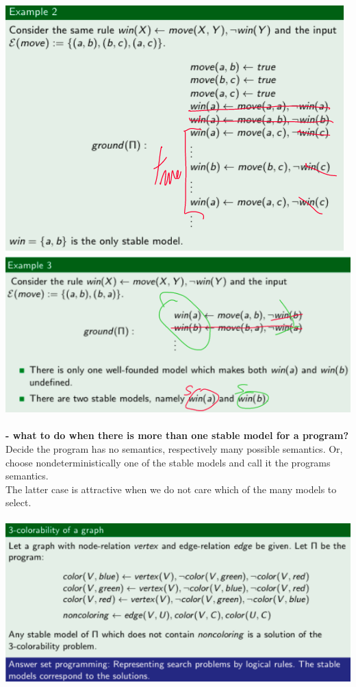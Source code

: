 \documentclass{article}
\begin{document}
\includegraphics[scale=0.4]{106.png}\includegraphics[scale=0.4]{108.png}\\\\
\textbf{- what to do when there is more than one stable model for a program?} Decide the program has no semantics, respectively many possible semantics. Or, choose nondeterministically one of the stable models and call it the programs semantics.\\
The latter case is attractive when we do not care which of the many models to select.\\\\
\includegraphics[scale=0.5]{107.png}
\end{document}
